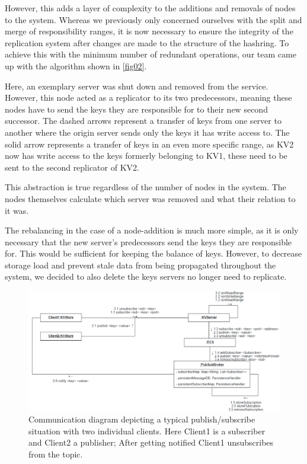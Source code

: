 \documentclass[sigconf]{acmart}
\begin{document}
However, this adds a layer of complexity to the additions and removals of nodes to the system. Whereas we previously only concerned ourselves with the split and merge of responsibility ranges, it is now necessary to ensure the integrity of the replication system after changes are made to the structure of the hashring. To achieve this with the minimum number of redundant operations, our team came up with the algorithm shown in \ref{fig02}.

Here, an exemplary server was shut down and removed from the service. However, this node acted as a replicator to its two predecessors, meaning these nodes have to send the keys they are responsible for to their new second successor. The dashed arrows represent a transfer of keys from one server to another where the origin server sends only the keys it has write access to. The solid arrow represents a transfer of keys in an even more specific range, as KV2 now has write access to the keys formerly belonging to KV1, these need to be sent to the second replicator of KV2.

This abstraction is true regardless of the number of nodes in the system. The nodes themselves calculate which server was removed and what their relation to it was.

The rebalancing in the case of a node-addition is much more simple, as it is only necessary that the new server's predecessors send the keys they are responsible for. This would be sufficient for keeping the balance of keys. However, to decrease storage load and prevent stale data from being propagated throughout the system, we decided to also delete the keys servers no longer need to replicate.

\begin{center}
  \begin{figure}[htbp]
    \centerline{\includegraphics[scale=0.475]{attachments/PubSub.png}}
    \caption{Communication diagram depicting a typical publish/subscribe situation with two individual clients. Here Client1 is a subscriber and Client2 a publisher; After getting notified Client1 unsubscribes from the topic.}
    \label{fig03}
  \end{figure}
\end{center}
\end{document}
